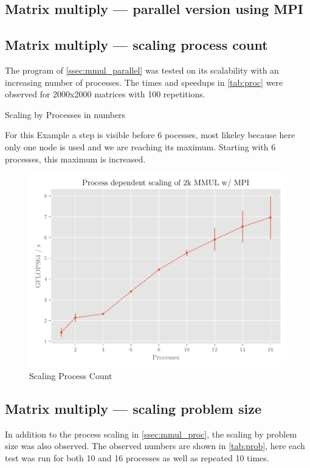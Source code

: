 \documentclass[]{scrartcl}
\begin{document}
\subsection{Matrix multiply --- parallel version using MPI}\label{ssec:mmul_parallel}
\subsection{Matrix multiply --- scaling process count}\label{ssec:mmul_proc}

The program of \autoref{ssec:mmul_parallel} was tested on its scalability with an increasing number of processes.
The times and speedups in \autoref{tab:proc} were observed for 2000x2000 matrices with 100 repetitions.

\begin{table}[ht]
    \centering
    
    \caption{Scaling by Processes in numbers}\label{tab:proc}
\end{table}

For this Example a step is visible before 6 pocesses, most likeley because here only one node is used and we are reaching its maximum. Starting with 6 processes, this maximum is increased.

\begin{figure}[H]
    \centering
    \includegraphics[width=\linewidth]{img/scaling_proc.pdf}
    \caption{Scaling Process Count}%
    \label{fig:scaling_proc}
\end{figure}

\subsection{Matrix multiply --- scaling problem size}
In addition to the process scaling in \autoref{ssec:mmul_proc}, the scaling by problem size was also observed. The observed numbers are shown in \autoref{tab:prob}, here each test was run for both 10 and 16 processes as well as repeated 10 times.
\end{document}
